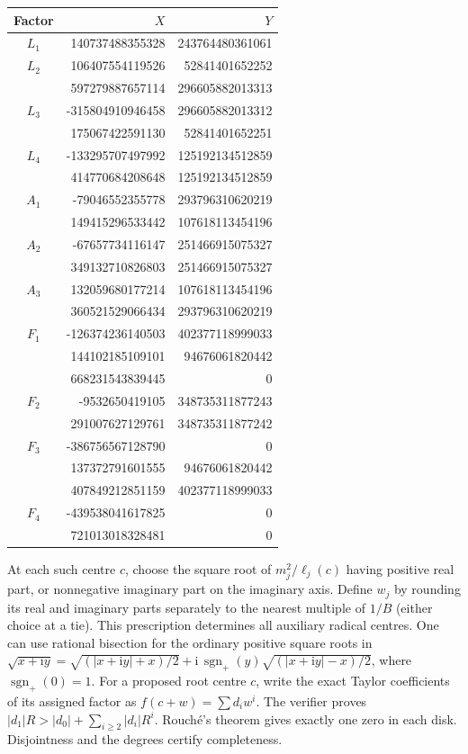 \documentclass[11pt,letterpaper]{article}
\theoremstyle{definition}
\begin{document}
\begin{center}\small
\begin{tabular}{crr}
Factor & $X$ & $Y$\\\hline
$L_{1}$ & 140737488355328 & 243764480361061\\
$L_{2}$ & 106407554119526 & 52841401652252\\
 & 597279887657114 & 296605882013313\\
$L_{3}$ & -315804910946458 & 296605882013312\\
 & 175067422591130 & 52841401652251\\
$L_{4}$ & -133295707497992 & 125192134512859\\
 & 414770684208648 & 125192134512859\\
$A_{1}$ & -79046552355778 & 293796310620219\\
 & 149415296533442 & 107618113454196\\
$A_{2}$ & -67657734116147 & 251466915075327\\
 & 349132710826803 & 251466915075327\\
$A_{3}$ & 132059680177214 & 107618113454196\\
 & 360521529066434 & 293796310620219\\
$F_{1}$ & -126374236140503 & 402377118999033\\
 & 144102185109101 & 94676061820442\\
 & 668231543839445 & 0\\
$F_{2}$ & -9532650419105 & 348735311877243\\
 & 291007627129761 & 348735311877242\\
$F_{3}$ & -386756567128790 & 0\\
 & 137372791601555 & 94676061820442\\
 & 407849212851159 & 402377118999033\\
$F_{4}$ & -439538041617825 & 0\\
 & 721013018328481 & 0\\
\end{tabular}
\end{center}

At each such centre $c$, choose the square root of $m_j^2/\ell_j(c)$ having positive real part, or nonnegative imaginary part on the imaginary axis. Define $w_j$ by rounding its real and imaginary parts separately to the nearest multiple of $1/B$ (either choice at a tie). This prescription determines all auxiliary radical centres. One can use rational bisection for the ordinary positive square roots in
$\sqrt{x+\mathrm{i}y}=\sqrt{(|x+\mathrm{i}y|+x)/2}
 +\mathrm{i}\,\operatorname{sgn}_+(y)\sqrt{(|x+\mathrm{i}y|-x)/2}$,
where $\operatorname{sgn}_+(0)=1$.
 For a proposed root centre \(c\), write the exact Taylor coefficients of its assigned factor as \(f(c+w)=\sum d_i w^i\). The verifier proves \(|d_1|R>|d_0|+\sum_{i\ge2}|d_i|R^i\). Rouché's theorem gives exactly one zero in each disk. Disjointness and the degrees certify completeness.
\end{document}
